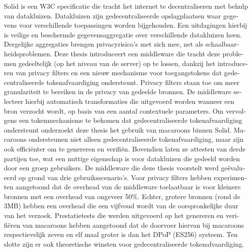 \begin{otherlanguage}{dutch}
{\small Solid is een W3C specificatie die tracht het internet te decentraliseren met behulp van datakluizen. Datakluizen zijn gedecentraliseerde opslagplaatsen waar gegevens voor verschillende toepassingen worden bijgehouden. Een uitdagingen hierbij is veilige en beschermde gegevensaggregatie over verschillende datakluizen heen. Dergelijke aggregaties brengen privacyrisico's met zich mee, net als schaalbaarheidsproblemen. Deze thesis introduceert een middleware die tracht deze problemen gedeeltelijk (op het niveau van de server) op te lossen, dankzij het introduceren van privacy filters en een nieuw mechanisme voor toegangstokens dat gedecentraliseerde tokenafvaardiging ondersteunt.
Privacy filters staan toe om meer granulariteit te bereiken in de privacy van gedeelde bronnen. De middleware selecteer hierbij automatisch transformaties die uitgevoerd worden wanneer een bron verzocht wordt, op basis van een aantal contextuele parameters. Om vervolgens een tokenmechanisme te bekomen dat gedecentraliseerde tokenafvaardiging ondersteunt onderzoekt deze thesis het gebruik van macaroons binnen Solid. Macaroons ondersteunen niet alleen gedecentraliseerde tokenafvaardiging, maar zijn ook effici{\"e}nter om te genereren en verifi{\"e}n. Bovendien laten ze attesten van derde partijen toe, wat een nuttige eigenschap is voor datakluizen die gedeeld worden door een groep gebruikers.
De middleware die deze thesis voorstelt werd ge{\"e}valueerd op grond van drie gebruiksscenario's. Voor privacy filters hebben experimenten aangetoond dat de overhead van de middleware toelaatbaar is voor kleinere bronnen met een overhead van ongeveer 50\%. Echter, grotere bronnen (rond de 3MB) hebben een overhead die een vijfvoud wordt van de oorspronkelijke duur van het verzoek. 
Prestatietests die werden uitgevoerd op het genereren en verifi{\"e}ren van macaroons hebben aangetoond dat de doorvoer hiervan bij macaroons respectievelijk zeven en elf maal groter is dan het DPoP (ES256) systeem. Ten slotte zijn er ook theoretische winsten voor gedecentraliseerde tokenafvaardiging.}
\end{otherlanguage}
\\